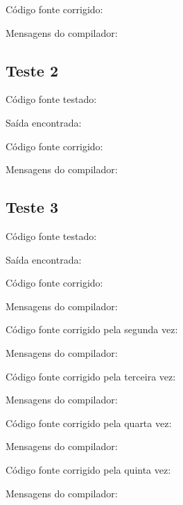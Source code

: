 \documentclass[11pt]{article}
\begin{document}
		Código fonte corrigido:
		
		
		Mensagens do compilador:
		
	
	\subsection{Teste 2}
		
		Código fonte testado:
		
			
		Saída encontrada:
		
		
		Código fonte corrigido:
		
		
		Mensagens do compilador:
		


	\subsection{Teste 3}
	
		Código fonte testado:
		
			
		Saída encontrada:
		
				
		Código fonte corrigido:
		
		
		Mensagens do compilador:
		
						
		Código fonte corrigido pela segunda vez:
		
		
		Mensagens do compilador:
		
		
		Código fonte corrigido pela terceira vez:
		
		
		Mensagens do compilador:
		
				
		Código fonte corrigido pela quarta vez:
		
		
		Mensagens do compilador:
		
						
		Código fonte corrigido pela quinta vez:
		
		
		Mensagens do compilador:
		
\end{document}
